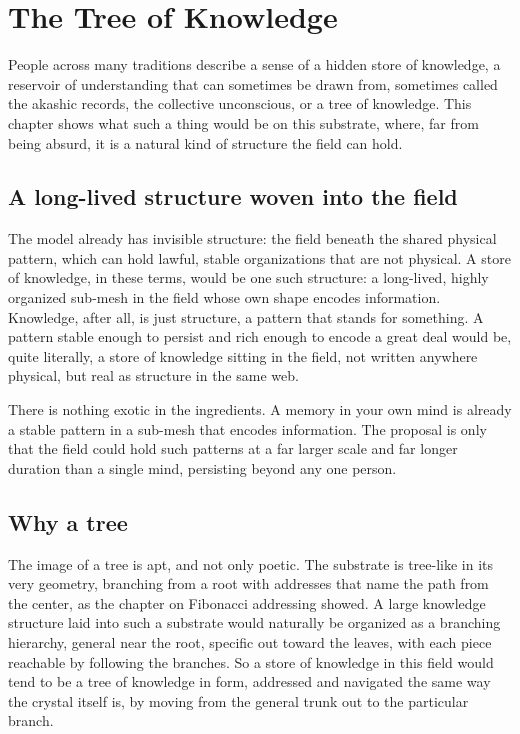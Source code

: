 \section{The Tree of Knowledge}

People across many traditions describe a sense of a hidden store of knowledge, a reservoir of understanding that can sometimes be drawn from, sometimes called the akashic records, the collective unconscious, or a tree of knowledge. This chapter shows what such a thing would be on this substrate, where, far from being absurd, it is a natural kind of structure the field can hold.

\subsection{A long-lived structure woven into the field}

The model already has invisible structure: the field beneath the shared physical pattern, which can hold lawful, stable organizations that are not physical. A store of knowledge, in these terms, would be one such structure: a long-lived, highly organized sub-mesh in the field whose own shape encodes information. Knowledge, after all, is just structure, a pattern that stands for something. A pattern stable enough to persist and rich enough to encode a great deal would be, quite literally, a store of knowledge sitting in the field, not written anywhere physical, but real as structure in the same web.

There is nothing exotic in the ingredients. A memory in your own mind is already a stable pattern in a sub-mesh that encodes information. The proposal is only that the field could hold such patterns at a far larger scale and far longer duration than a single mind, persisting beyond any one person.

\subsection{Why a tree}

The image of a tree is apt, and not only poetic. The substrate is tree-like in its very geometry, branching from a root with addresses that name the path from the center, as the chapter on Fibonacci addressing showed. A large knowledge structure laid into such a substrate would naturally be organized as a branching hierarchy, general near the root, specific out toward the leaves, with each piece reachable by following the branches. So a store of knowledge in this field would tend to be a tree of knowledge in form, addressed and navigated the same way the crystal itself is, by moving from the general trunk out to the particular branch.

